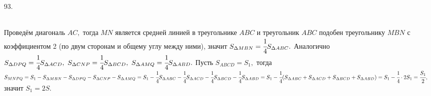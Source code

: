 93. \begin{figure}[ht!]
\end{figure}\\
Проведём диагональ $AC,$ тогда $MN$ является средней линией в треугольнике $ABC$ и треугольник $ABC$ подобен треугольнику $MBN$ с коэффициентом 2 (по двум сторонам и общему углу между ними), значит $S_{\Delta MBN}=\cfrac{1}{4}S_{\Delta ABC}.$ Аналогично $S_{\Delta DPQ}=\cfrac{1}{4}S_{\Delta ACD},\  S_{\Delta CNP}=\cfrac{1}{4}S_{\Delta BCD},\ S_{\Delta AMQ}=\cfrac{1}{4}S_{\Delta ABD}.$ Пусть $S_{ABCD}=S_1,$ тогда $S_{MNPQ}=S_1-S_{\Delta MBN}-S_{\Delta DPQ}-S_{\Delta CNP}-S_{\Delta AMQ}=
S_1-\cfrac{1}{4}S_{\Delta ABC}-\cfrac{1}{4}S_{\Delta ACD}-\cfrac{1}{4}S_{\Delta BCD}-\cfrac{1}{4}S_{\Delta ABD}=S_1-\cfrac{1}{4}(S_{\Delta ABC}+S_{\Delta ACD}+
S_{\Delta BCD}+S_{\Delta ABD})=S_1-\cfrac{1}{4}\cdot2S_1=\cfrac{S_1}{2},$ значит $S_1=2S.$\\
